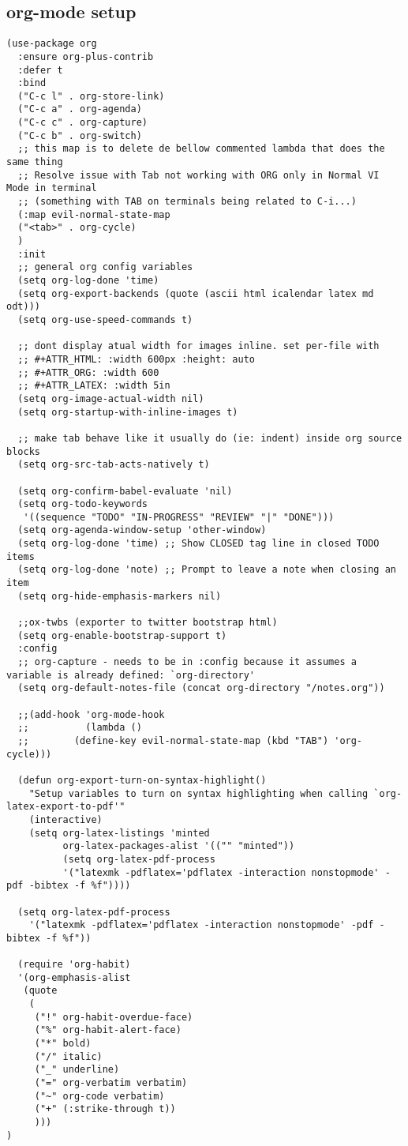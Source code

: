 \documentclass[11pt]{article}
\begin{document}
\subsection*{org-mode setup}
\label{sec:org5a460cc}
\begin{verbatim}
(use-package org
  :ensure org-plus-contrib
  :defer t
  :bind
  ("C-c l" . org-store-link)
  ("C-c a" . org-agenda)
  ("C-c c" . org-capture)
  ("C-c b" . org-switch)
  ;; this map is to delete de bellow commented lambda that does the same thing
  ;; Resolve issue with Tab not working with ORG only in Normal VI Mode in terminal
  ;; (something with TAB on terminals being related to C-i...)
  (:map evil-normal-state-map
  ("<tab>" . org-cycle)
  )
  :init
  ;; general org config variables
  (setq org-log-done 'time)
  (setq org-export-backends (quote (ascii html icalendar latex md odt)))
  (setq org-use-speed-commands t)

  ;; dont display atual width for images inline. set per-file with
  ;; #+ATTR_HTML: :width 600px :height: auto
  ;; #+ATTR_ORG: :width 600
  ;; #+ATTR_LATEX: :width 5in
  (setq org-image-actual-width nil)
  (setq org-startup-with-inline-images t)

  ;; make tab behave like it usually do (ie: indent) inside org source blocks
  (setq org-src-tab-acts-natively t)

  (setq org-confirm-babel-evaluate 'nil)
  (setq org-todo-keywords
   '((sequence "TODO" "IN-PROGRESS" "REVIEW" "|" "DONE")))
  (setq org-agenda-window-setup 'other-window)
  (setq org-log-done 'time) ;; Show CLOSED tag line in closed TODO items
  (setq org-log-done 'note) ;; Prompt to leave a note when closing an item
  (setq org-hide-emphasis-markers nil)

  ;;ox-twbs (exporter to twitter bootstrap html)
  (setq org-enable-bootstrap-support t)
  :config
  ;; org-capture - needs to be in :config because it assumes a variable is already defined: `org-directory'
  (setq org-default-notes-file (concat org-directory "/notes.org"))

  ;;(add-hook 'org-mode-hook
  ;;          (lambda ()
  ;;        (define-key evil-normal-state-map (kbd "TAB") 'org-cycle)))

  (defun org-export-turn-on-syntax-highlight()
    "Setup variables to turn on syntax highlighting when calling `org-latex-export-to-pdf'"
    (interactive)
    (setq org-latex-listings 'minted
          org-latex-packages-alist '(("" "minted"))
          (setq org-latex-pdf-process
          '("latexmk -pdflatex='pdflatex -interaction nonstopmode' -pdf -bibtex -f %f"))))

  (setq org-latex-pdf-process
    '("latexmk -pdflatex='pdflatex -interaction nonstopmode' -pdf -bibtex -f %f"))

  (require 'org-habit)
  '(org-emphasis-alist
   (quote
    (
     ("!" org-habit-overdue-face)
     ("%" org-habit-alert-face)
     ("*" bold)
     ("/" italic)
     ("_" underline)
     ("=" org-verbatim verbatim)
     ("~" org-code verbatim)
     ("+" (:strike-through t))
     )))
)
\end{verbatim}
\end{document}
